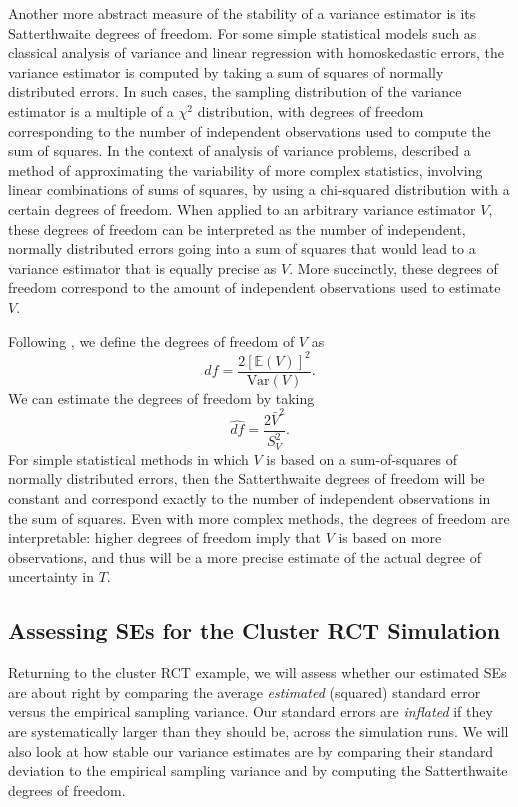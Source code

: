 \documentclass[
]{book}
\newcommand{\E}{\mathbb{E}}
\newcommand{\Var}{\text{Var}}
\begin{document}
Another more abstract measure of the stability of a variance estimator is its Satterthwaite degrees of freedom.
For some simple statistical models such as classical analysis of variance and linear regression with homoskedastic errors, the variance estimator is computed by taking a sum of squares of normally distributed errors.
In such cases, the sampling distribution of the variance estimator is a multiple of a \(\chi^2\) distribution, with degrees of freedom corresponding to the number of independent observations used to compute the sum of squares.
In the context of analysis of variance problems, \citet{Satterthwaite1946approximate} described a method of approximating the variability of more complex statistics, involving linear combinations of sums of squares, by using a chi-squared distribution with a certain degrees of freedom.
When applied to an arbitrary variance estimator \(V\), these degrees of freedom can be interpreted as the number of independent, normally distributed errors going into a sum of squares that would lead to a variance estimator that is equally precise as \(V\).
More succinctly, these degrees of freedom correspond to the amount of independent observations used to estimate \(V\).

Following \citet{Satterthwaite1946approximate}, we define the degrees of freedom of \(V\) as
\[
df = \frac{2 \left[\E(V)\right]^2}{\Var(V)}.
\label{eq:Satterthwaite-df}
\]
We can estimate the degrees of freedom by taking
\[
\widehat{df} = \frac{2 \bar{V}^2}{S_V^2}.
\label{eq:Satterthwaite-df-estimator}
\]
For simple statistical methods in which \(V\) is based on a sum-of-squares of normally distributed errors, then the Satterthwaite degrees of freedom will be constant and correspond exactly to the number of independent observations in the sum of squares.
Even with more complex methods, the degrees of freedom are interpretable: higher degrees of freedom imply that \(V\) is based on more observations, and thus will be a more precise estimate of the actual degree of uncertainty in \(T\).

\subsection{Assessing SEs for the Cluster RCT Simulation}\label{assessing-ses-for-the-cluster-rct-simulation}

Returning to the cluster RCT example, we will assess whether our estimated SEs are about right by comparing the average \emph{estimated} (squared) standard error versus the empirical sampling variance.
Our standard errors are \emph{inflated} if they are systematically larger than they should be, across the simulation runs.
We will also look at how stable our variance estimates are by comparing their standard deviation to the empirical sampling variance and by computing the Satterthwaite degrees of freedom.
\end{document}
